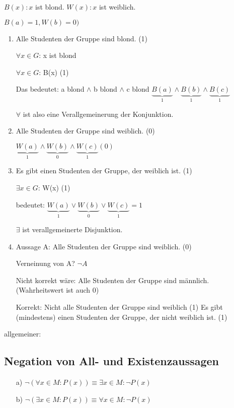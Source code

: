 \documentclass[a4paper, 12pt, twoside] {article}
\newcommand{\attention}{{\fontencoding{U}\fontfamily{futs}\selectfont\char 66\relax}\space}
\begin{document}
$B(x): x$ ist blond.
$W(x): x$ ist weiblich.

$B(a) = 1, W(b) = 0)$

\begin{enumerate}

\item Alle Studenten der Gruppe sind blond. (1)

$\forall x \in G$: x ist blond

$\forall x \in G$: B(x) (1)

Das bedeutet:
a blond $\wedge$ b blond $\wedge$ c blond \newline
$\underbrace{B(a)}_{1} \wedge \underbrace{B(b)}_{1} \wedge \underbrace{B(c)}_{1}$

$\forall$ ist also eine Verallgemeinerung der Konjunktion.

\item Alle Studenten der Gruppe sind weiblich. (0)

$\underbrace{W(a)}_{1} \wedge \underbrace{W(b)}_{0} \wedge \underbrace{W(c)}_{1} (0)$

\item Es gibt einen Studenten der Gruppe, der weiblich ist. (1)

$\exists x \in G$: W(x) (1)

bedeutet: $\underbrace{W(a)}_{1} \lor \underbrace{W(b)}_{0} \lor \underbrace{W(c)}_{1} = 1$

$\exists$ ist verallgemeinerte Disjunktion.

\item Aussage A: Alle Studenten der Gruppe sind weiblich. (0)

Verneinung von A? $\neg A$

\attention Nicht korrekt wäre: Alle Studenten der Gruppe sind männlich. (Wahrheitswert ist auch 0)

Korrekt: Nicht alle Studenten der Gruppe sind weiblich (1)
Es gibt (mindestens) einen Studenten der Gruppe, der nicht weiblich ist. (1)

\end{enumerate}

allgemeiner:

\subsection{Negation von All- und Existenzaussagen}

\begin{itemize}
\item[a)] $\neg (\forall x \in M: P(x)) \equiv \exists x \in M: \neg P(x)$
\item[b)] $\neg (\exists x \in M: P(x)) \equiv \forall x \in M : \neg P(x)$
\end{itemize}
\end{document}
